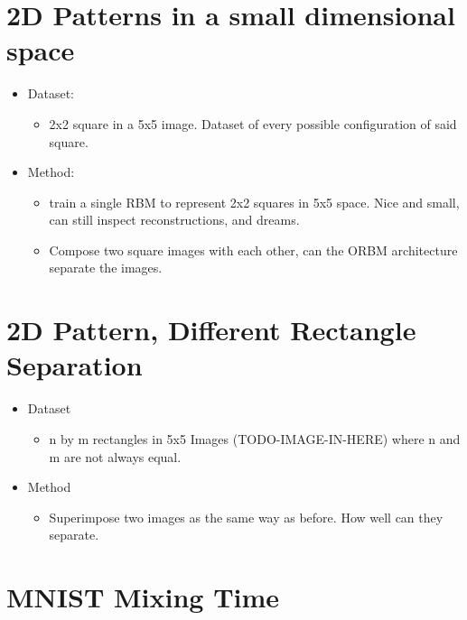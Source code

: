 

\section{2D Patterns in a small dimensional space}



\begin{itemize}
    \item Dataset:
    \begin{itemize}
      \item 2x2 square in a 5x5 image. Dataset of every possible configuration of said square.
    \end{itemize}
    \item Method:
    \begin{itemize}
      \item train a single RBM to represent 2x2 squares in 5x5 space. Nice and small, can still inspect reconstructions, and dreams.
      \item Compose two square images with each other, can the ORBM architecture separate the images.
    \end{itemize}
  \end{itemize}

    \section{2D Pattern, Different Rectangle Separation}
    \begin{itemize}
      \item Dataset
      \begin{itemize}
        \item n by m rectangles in 5x5 Images (TODO-IMAGE-IN-HERE) where n and m are not always equal.
      \end{itemize}
      \item Method
      \begin{itemize}
        \item Superimpose two images as the same way as before. How well can they separate.
      \end{itemize}
    \end{itemize}

    \section{MNIST Mixing Time}

